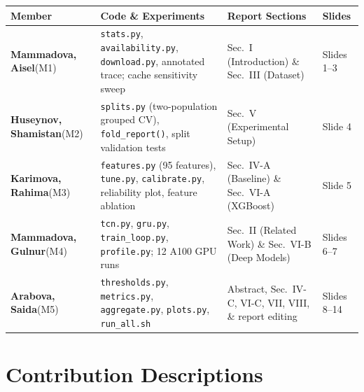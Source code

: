 \documentclass[11pt,a4paper]{article}
\begin{document}
\begin{table}[htbp]
\centering
\small
\renewcommand{\arraystretch}{1.5}
\begin{tabularx}{\textwidth}{@{} L{3.2cm} X L{4.4cm} L{2.2cm} @{}}
\toprule
\textbf{Member} & \textbf{Code \& Experiments} & \textbf{Report Sections} & \textbf{Slides} \\
\midrule

\textbf{Mammadova, Aisel}\newline(M1)
  & \texttt{stats.py}, \texttt{availability.py}, \texttt{download.py}, annotated trace; cache sensitivity sweep
  & Sec.~I (Introduction) \& Sec.~III (Dataset)
  & Slides 1--3 \\

\textbf{Huseynov, Shamistan}\newline(M2)
  & \texttt{splits.py} (two-population grouped CV), \texttt{fold\_report()}, split validation tests
  & Sec.~V (Experimental Setup)
  & Slide 4 \\

\textbf{Karimova, Rahima}\newline(M3)
  & \texttt{features.py} (95 features), \texttt{tune.py}, \texttt{calibrate.py}, reliability plot, feature ablation
  & Sec.~IV-A (Baseline) \& Sec.~VI-A (XGBoost)
  & Slide 5 \\

\textbf{Mammadova, Gulnur}\newline(M4)
  & \texttt{tcn.py}, \texttt{gru.py}, \texttt{train\_loop.py}, \texttt{profile.py}; 12 A100 GPU runs
  & Sec.~II (Related Work) \& Sec.~VI-B (Deep Models)
  & Slides 6--7 \\

\textbf{Arabova, Saida}\newline(M5)
  & \texttt{thresholds.py}, \texttt{metrics.py}, \texttt{aggregate.py}, \texttt{plots.py}, \texttt{run\_all.sh}
  & Abstract, Sec.~IV-C, VI-C, VII, VIII, \& report editing
  & Slides 8--14 \\

\bottomrule
\end{tabularx}
\end{table}

\vspace{0.5em}

\section*{Contribution Descriptions}
\end{document}
